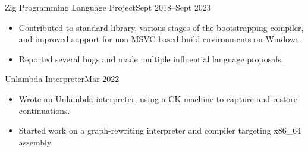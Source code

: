 \documentclass[a4paper,10pt]{article}
\begin{document}
    \begin{activity}{Zig Programming Language Project}{Sept 2018--Sept 2023}
      \begin{itemize}[topsep=4pt, partopsep=0pt, itemsep=-2pt]
        \item Contributed to standard library, various stages of the bootstrapping compiler, and improved support for non-MSVC based build environments on Windows.
        \item Reported several bugs and made multiple influential language proposals.
      \end{itemize}
    \end{activity}


    \begin{activity}{Unlambda Interpreter}{Mar 2022}
      \begin{itemize}[topsep=4pt, partopsep=0pt, itemsep=-2pt]
        \item Wrote an Unlambda interpreter, using a CK machine to capture and restore continuations.
        \item Started work on a graph-rewriting interpreter and compiler targeting x86\_64 assembly.
      \end{itemize}
    \end{activity}

\end{document}
